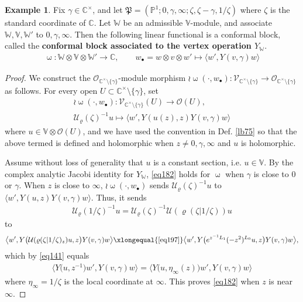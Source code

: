 \documentclass[11pt,b5paper,notitlepage]{article}
\theoremstyle{definition}
\newtheorem{eg}[df]{Example}
\theoremstyle{plain}
\newcommand{\fk}{\mathfrak}
\newcommand{\mc}{\mathcal}
\newcommand{\bk}[1]{\langle {#1}\rangle}
\newcommand{\bigbk}[1]{\big\langle {#1}\big\rangle}
\newcommand{\scr}{\mathscr}
\newcommand{\blt}{\bullet}
\newcommand{\Vbb}{\mathbb V}
\newcommand{\Wbb}{\mathbb W}
\newcommand{\Cbb}{\mathbb C}
\newcommand{\Pbb}{\mathbb P}
\numberwithin{equation}{section}
\begin{document}
\begin{eg}\label{lb173}
Fix $\gamma\in\Cbb^\times$, and let $\fk P=(\Pbb^1;0,\gamma,\infty;\zeta,\zeta-\gamma,1/\zeta)$ where $\zeta$ is the standard coordinate of $\Cbb$. Let $\Wbb$ be an admissible $\Vbb$-module, and associate $\Wbb,\Vbb,\Wbb'$ to $0,\gamma,\infty$. Then the following linear functional is a conformal block, called the \textbf{conformal block associated to the vertex operation $Y_\Wbb$}.
\begin{gather}
\upomega:\Wbb\otimes\Vbb\otimes\Wbb'\rightarrow\Cbb,\qquad w_\blt=w\otimes v\otimes w'\mapsto \bk{w',Y(v,\gamma)w}
\end{gather}



\end{eg}


\begin{proof}
We construct the $\scr O_{\Cbb^\times\setminus\{\gamma\}}$-module morphism $\wr\upomega(\cdot,w_\blt):\scr V_{\Cbb^\times\setminus\{\gamma\}}\rightarrow\scr O_{\Cbb^\times\setminus\{\gamma\}}$ as follows. For every open $U\subset \Cbb^\times\setminus\{\gamma\}$, set
\begin{gather*}
\wr\upomega(\cdot,w_\blt):\scr V_{\Cbb^\times\setminus\{\gamma\}}(U)\rightarrow\scr O(U),\\
\mc U_\varrho(\zeta)^{-1}u\mapsto \bk{w',Y(u(z),z)Y(v,\gamma)w}
\end{gather*}
where $u\in\Vbb\otimes\scr O(U)$, and we have used the convention in Def. \ref{lb75} so that the above termed is defined and holomorphic when $z\neq 0,\gamma,\infty$ and $u$ is holomorphic.

Assume without loss of generality that $u$ is a constant section, i.e. $u\in\Vbb$. By the complex analytic Jacobi identity for $Y_\Wbb$,  \eqref{eq182} holds for $\upomega$ when $\gamma$ is close to $0$ or $\gamma$. When $z$ is close to $\infty$,  $\wr\upomega(\cdot,w_\blt)$ sends $\mc U_\varrho(\zeta)^{-1}u$ to $\bk{w',Y(u,z)Y(v,\gamma)w}$. Thus, it sends
\begin{align*}
\mc U_\varrho(1/\zeta)^{-1}u=\mc U_\varrho(\zeta)^{-1}\mc U(\varrho(\zeta|1/\zeta))u
\end{align*}
to
\begin{align*}
\bigbk{w',Y\big(\mc U(\varrho(\zeta|1/\zeta)_z)u,z\big)Y(v,\gamma)w}\xlongequal{\eqref{eq197}} \bigbk{w',Y\big(e^{z^{-1}L_1}(-z^2)^{L_0}u,z\big)Y(v,\gamma)w},
\end{align*}
which by \eqref{eq141} equals
\begin{align*}
\bigbk{Y\big(u,z^{-1}\big)w',Y(v,\gamma)w}=\bigbk{Y\big(u,\eta_\infty(z)\big)w',Y(v,\gamma)w}
\end{align*}
where $\eta_\infty=1/\zeta$ is the local coordinate at $\infty$. This proves \eqref{eq182} when $z$ is near $\infty$. 
\end{proof}
\end{document}
